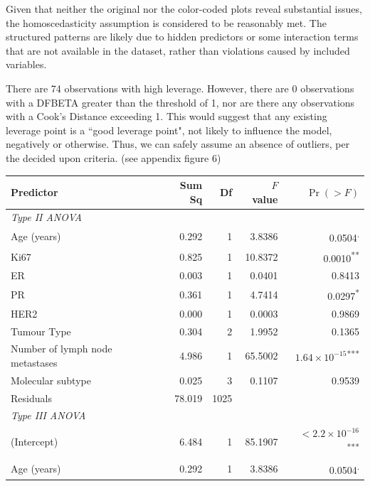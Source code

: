 \documentclass[letter]{article}
\begin{document}
Given that neither the original nor the color-coded plots reveal substantial issues, the homoscedasticity assumption is considered to be reasonably met. 
The structured patterns are likely due to hidden predictors or some interaction terms that are not available in the dataset, rather than violations caused by included variables.

There are 74 observations with high leverage. However, there are 0 observations with a DFBETA greater than the threshold of 1, nor are there any observations with a Cook's Distance exceeding 1. This would suggest that any existing leverage point is a ``good leverage point", not likely to influence the model, negatively or otherwise. Thus, we can safely assume an absence of outliers, per the decided upon criteria. 
 (see appendix figure 6)


\begin{table}[htbp]
\centering
\label{tab:anova_results}
\begin{tabular}{lrrrr}
\hline
\textbf{Predictor} & \textbf{Sum Sq} & \textbf{Df} & \textbf{$F$ value} & \textbf{$\Pr(>F)$} \\
\hline
\multicolumn{5}{l}{\textit{Type II ANOVA}} \\
Age (years)                       & 0.292 & 1 & 3.8386 & 0.0504\textsuperscript{.} \\
Ki67                               & 0.825 & 1 & 10.8372 & 0.0010\textsuperscript{**} \\
ER                                 & 0.003 & 1 & 0.0401 & 0.8413 \\
PR                                 & 0.361 & 1 & 4.7414 & 0.0297\textsuperscript{*} \\
HER2                               & 0.000 & 1 & 0.0003 & 0.9869 \\
Tumour Type                        & 0.304 & 2 & 1.9952 & 0.1365 \\
Number of lymph node metastases    & 4.986 & 1 & 65.5002 & $1.64\times10^{-15}$\textsuperscript{***} \\
Molecular subtype                  & 0.025 & 3 & 0.1107 & 0.9539 \\
Residuals                          & 78.019 & 1025 &  &  \\
\hline
\multicolumn{5}{l}{\textit{Type III ANOVA}} \\
(Intercept)                        & 6.484 & 1 & 85.1907 & $< 2.2\times10^{-16}$\textsuperscript{***} \\
Age (years)                        & 0.292 & 1 & 3.8386 & 0.0504\textsuperscript{.} \\

\end{tabular}
\end{table}
\end{document}
